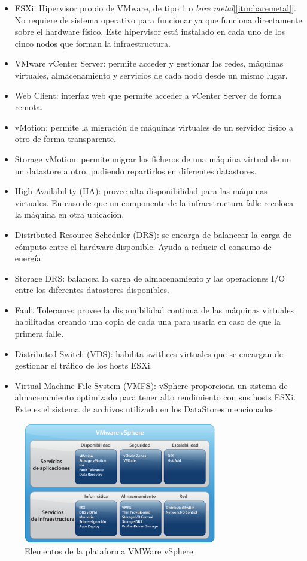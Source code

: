 \begin{itemize}
    \item ESXi: Hipervisor propio de VMware, de tipo 1 o \textit{bare metal}[\ref{itm:baremetal}]. No requiere de sistema operativo para funcionar ya que funciona directamente sobre el hardware físico\cite{Esxi}. Este hipervisor está instalado en cada uno de los cinco nodos que forman la infraestructura.
    \item VMware vCenter Server: permite acceder y gestionar las redes, máquinas virtuales, almacenamiento y servicios de cada nodo desde un mismo lugar.
    \item Web Client: interfaz web que permite acceder a vCenter Server de forma remota.
    \item vMotion: permite la migración de máquinas virtuales de un servidor físico a otro de forma transparente.
    \item Storage vMotion: permite migrar los ficheros de una máquina virtual de un un datastore a otro, pudiendo repartirlos en diferentes datastores.
    \item High Availability (HA): provee alta disponibilidad para las máquinas virtuales. En caso de que un componente de la infraestructura falle recoloca la máquina en otra ubicación.
    \item Distributed Resource Scheduler (DRS): se encarga de balancear la carga de cómputo entre el hardware disponible. Ayuda a reducir el consumo de energía.
    \item Storage DRS: balancea la carga de almacenamiento y las operaciones I/O entre los diferentes datastores disponibles.
    \item Fault Tolerance: provee la disponibilidad continua de las máquinas virtuales habilitadas creando una copia de cada una  para usarla en caso de que la primera falle.
    \item Distributed Switch (VDS): habilita swithces virtuales que se encargan de gestionar el tráfico de los hosts ESXi.
    \item Virtual Machine File System (VMFS): vSphere proporciona un sistema de almacenamiento optimizado para tener alto rendimiento con sus hosts ESXi. Este es el sistema de archivos utilizado en los DataStores mencionados.
\end{itemize}

\begin{figure}[hp!]
  \centering
  \includegraphics[width=0.75\textwidth]{imaxes/cap2recursos/contentVSphere}
  \caption{Elementos de la plataforma VMWare vSphere\cite{fotovSphere}}
  \label{fig:componentesVSphere}
\end{figure}

